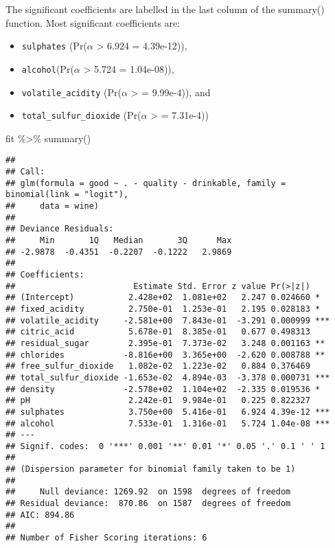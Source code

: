 \documentclass[
]{article}
\newenvironment{Shaded}{\begin{snugshade}}{\end{snugshade}}
\newcommand{\FunctionTok}[1]{\textcolor[rgb]{0.00,0.00,0.00}{#1}}
\newcommand{\NormalTok}[1]{#1}
\newcommand{\SpecialCharTok}[1]{\textcolor[rgb]{0.00,0.00,0.00}{#1}}
\providecommand{\tightlist}{%
  \setlength{\itemsep}{0pt}\setlength{\parskip}{0pt}}
\begin{document}
The significant coefficients are labelled in the last column of the
summary() function. Most significant coefficients are:

\begin{itemize}
\tightlist
\item
  \texttt{sulphates} (Pr(\(\alpha\) \textgreater{} 6.924 = 4.39e-12)),
\item
  \texttt{alcohol}(Pr(\(\alpha\) \textgreater{} 5.724 = 1.04e-08)),
\item
  \texttt{volatile\_acidity} (Pr(\(\alpha\) \textgreater{}
  \textbar{} = 9.99e-4)), and
\item
  \texttt{total\_sulfur\_dioxide} (Pr(\(\alpha\) \textgreater{}
  \textbar{} = 7.31e-4))
\end{itemize}

\begin{Shaded}
\begin{Highlighting}[]
\NormalTok{fit }\SpecialCharTok{\%\textgreater{}\%} \FunctionTok{summary}\NormalTok{()}
\end{Highlighting}
\end{Shaded}

\begin{verbatim}
## 
## Call:
## glm(formula = good ~ . - quality - drinkable, family = binomial(link = "logit"), 
##     data = wine)
## 
## Deviance Residuals: 
##     Min       1Q   Median       3Q      Max  
## -2.9878  -0.4351  -0.2207  -0.1222   2.9869  
## 
## Coefficients:
##                        Estimate Std. Error z value Pr(>|z|)    
## (Intercept)           2.428e+02  1.081e+02   2.247 0.024660 *  
## fixed_acidity         2.750e-01  1.253e-01   2.195 0.028183 *  
## volatile_acidity     -2.581e+00  7.843e-01  -3.291 0.000999 ***
## citric_acid           5.678e-01  8.385e-01   0.677 0.498313    
## residual_sugar        2.395e-01  7.373e-02   3.248 0.001163 ** 
## chlorides            -8.816e+00  3.365e+00  -2.620 0.008788 ** 
## free_sulfur_dioxide   1.082e-02  1.223e-02   0.884 0.376469    
## total_sulfur_dioxide -1.653e-02  4.894e-03  -3.378 0.000731 ***
## density              -2.578e+02  1.104e+02  -2.335 0.019536 *  
## pH                    2.242e-01  9.984e-01   0.225 0.822327    
## sulphates             3.750e+00  5.416e-01   6.924 4.39e-12 ***
## alcohol               7.533e-01  1.316e-01   5.724 1.04e-08 ***
## ---
## Signif. codes:  0 '***' 0.001 '**' 0.01 '*' 0.05 '.' 0.1 ' ' 1
## 
## (Dispersion parameter for binomial family taken to be 1)
## 
##     Null deviance: 1269.92  on 1598  degrees of freedom
## Residual deviance:  870.86  on 1587  degrees of freedom
## AIC: 894.86
## 
## Number of Fisher Scoring iterations: 6
\end{verbatim}
\end{document}
